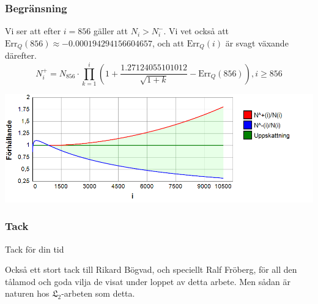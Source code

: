 \documentclass{beamer}
\begin{document}
\begin{frame}
	\frametitle{Begränsning}
Vi ser att efter $i=856$ gäller att $N_i>N^-_i$. Vi vet också att $\text{Err}_Q(856) \approx -0.000194294156604657$, och att $\text{Err}_Q(i)$ är svagt växande därefter.
\[N^+_i = N_{856} \cdot \prod_{k=1}^{i} \left(1+\frac{1.27124055101012}{\sqrt{1+k}}-\text{Err}_Q(856)\right), i\geq 856 \]
\begin{center}
	\includegraphics[scale=0.5]{Export/Complexity20.png}
\end{center}
\end{frame}

\begin{frame}
	\frametitle{Tack}
	
	\begin{center}
		\Large Tack för din tid
		
		\vspace{20pt}
		
		\normalsize
Också ett stort tack till Rikard Bögvad, och speciellt Ralf Fröberg, för all den tålamod och goda vilja de visat under loppet av detta arbete. Men sådan är naturen hos $\mathfrak{L}_2$-arbeten som detta.
	\end{center}
\end{frame}
\end{document}
